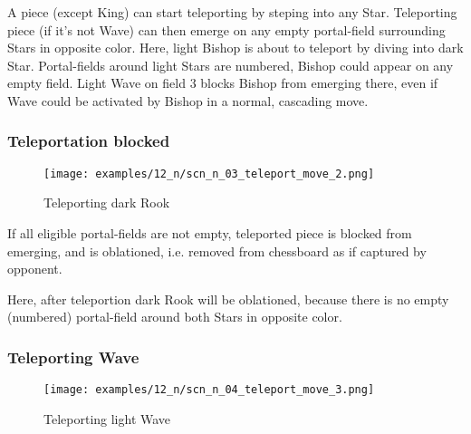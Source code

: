 \vspace*{-0.5\baselineskip}
A piece (except King) can start teleporting by steping into any Star.
Teleporting piece (if it's not Wave) can then emerge on any empty portal-field
surrounding Stars in opposite color.
Here, light Bishop is about to teleport by diving into dark Star. Portal-fields
around light Stars are numbered, Bishop could appear on any empty field. Light
Wave on field 3 blocks Bishop from emerging there, even if Wave could be activated
by Bishop in a normal, cascading move.

\clearpage %

\subsubsection*{Teleportation blocked}
\label{sec:Nineteen/Star/Teleporting pieces/Teleportation blocked}

\vspace*{-1.0\baselineskip}
\noindent
\begin{figure}[!h]
\texttt{[image: examples/12\_n/scn\_n\_03\_teleport\_move\_2.png]}
\caption{Teleporting dark Rook}
\label{fig:scn_n_03_teleport_move_2}
\end{figure}

If all eligible portal-fields are not empty, teleported piece is blocked from
emerging, and is oblationed, i.e. removed from chessboard as if captured by
opponent.

Here, after teleportion dark Rook will be oblationed, because there is no empty
(numbered) portal-field around both Stars in opposite color.

\clearpage %

\subsubsection*{Teleporting Wave}
\label{sec:Nineteen/Star/Teleporting pieces/Teleporting Wave}

\vspace*{-1.0\baselineskip}
\noindent
\begin{figure}[!h]
\texttt{[image: examples/12\_n/scn\_n\_04\_teleport\_move\_3.png]}
\caption{Teleporting light Wave}
\label{fig:scn_n_04_teleport_move_3}
\end{figure}

